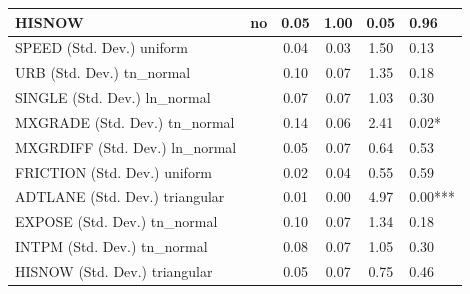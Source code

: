 \begin{table}
\begin{center}
\begin{tabular}{|l|l|c|c|c|l|}
			\hline
			HISNOW & no & 0.05 & 1.00 & 0.05 & 0.96 \\
			\hline
			SPEED (Std. Dev.) uniform &  & 0.04 & 0.03 & 1.50 & 0.13 \\
			\hline
			URB (Std. Dev.) tn_normal &  & 0.10 & 0.07 & 1.35 & 0.18 \\
			\hline
			SINGLE (Std. Dev.) ln_normal &  & 0.07 & 0.07 & 1.03 & 0.30 \\
			\hline
			MXGRADE (Std. Dev.) tn_normal &  & 0.14 & 0.06 & 2.41 & 0.02* \\
			\hline
			MXGRDIFF (Std. Dev.) ln_normal &  & 0.05 & 0.07 & 0.64 & 0.53 \\
			\hline
			FRICTION (Std. Dev.) uniform &  & 0.02 & 0.04 & 0.55 & 0.59 \\
			\hline
			ADTLANE (Std. Dev.) triangular &  & 0.01 & 0.00 & 4.97 & 0.00*** \\
			\hline
			EXPOSE (Std. Dev.) tn_normal &  & 0.10 & 0.07 & 1.34 & 0.18 \\
			\hline
			INTPM (Std. Dev.) tn_normal &  & 0.08 & 0.07 & 1.05 & 0.30 \\
			\hline
			HISNOW (Std. Dev.) triangular &  & 0.05 & 0.07 & 0.75 & 0.46 \\
			\hline
		\end{tabular}
	\end{center}
\end{table}